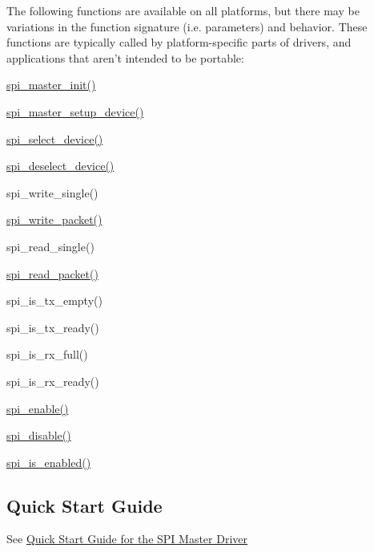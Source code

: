 The following functions are available on all platforms, but there may be variations in the function signature (i.\-e. parameters) and behavior. These functions are typically called by platform-\/specific parts of drivers, and applications that aren't intended to be portable\-:
\begin{DoxyItemize}
\item \hyperlink{group__xmega__spi__master__group_ga3238676989038a9dec0ebcd3aa625a42}{spi\-\_\-master\-\_\-init()}
\item \hyperlink{group__xmega__spi__master__group_ga81164f6dd2297a64337f3a052171e0f8}{spi\-\_\-master\-\_\-setup\-\_\-device()}
\item \hyperlink{group__xmega__spi__master__group_gac8751c855b90ea2774b5007f519e487e}{spi\-\_\-select\-\_\-device()}
\item \hyperlink{group__xmega__spi__master__group_gad528d94d606bda0fa6503f77a6a7bb78}{spi\-\_\-deselect\-\_\-device()}
\item spi\-\_\-write\-\_\-single()
\item \hyperlink{group__xmega__spi__master__group_ga60595beff80eae31c8dad32a8720865a}{spi\-\_\-write\-\_\-packet()}
\item spi\-\_\-read\-\_\-single()
\item \hyperlink{group__xmega__spi__master__group_ga504ee6688009acff607e0304cc59278d}{spi\-\_\-read\-\_\-packet()}
\item spi\-\_\-is\-\_\-tx\-\_\-empty()
\item spi\-\_\-is\-\_\-tx\-\_\-ready()
\item spi\-\_\-is\-\_\-rx\-\_\-full()
\item spi\-\_\-is\-\_\-rx\-\_\-ready()
\item \hyperlink{group__xmega__spi__master__group_ga82974e81370360e53b1276113de8a462}{spi\-\_\-enable()}
\item \hyperlink{group__xmega__spi__master__group_gaea58710ce1a779f0eb234f24094b0120}{spi\-\_\-disable()}
\item \hyperlink{group__xmega__spi__master__group_ga7d25f0b8b0b0eef0e71123d90d5f58c2}{spi\-\_\-is\-\_\-enabled()}
\end{DoxyItemize}\hypertarget{group__spi__group_spi_master_quickstart_section}{}\subsection{Quick Start Guide}\label{group__spi__group_spi_master_quickstart_section}
See \hyperlink{common_spi_master_quickstart}{Quick Start Guide for the S\-P\-I Master Driver} 